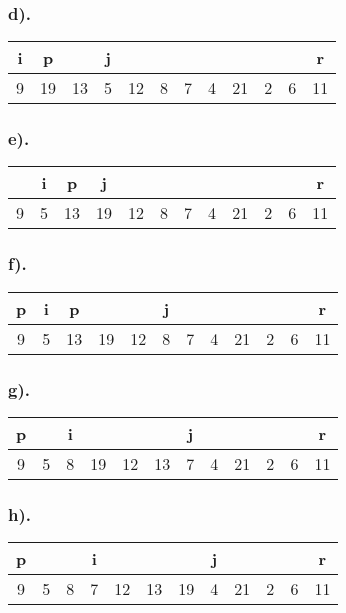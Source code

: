 \documentclass[11pt,letterpaper]{article}
\begin{document}
\subsubsection*{d).}
\begin{tabular}{ | c | c | c | c | c | c | c | c | c | c | c | c | }
		i	&	p	&		&	j	&		&		&		&		&		&		&		&	r	\\
	\hline
		9	&	19	&	13	&	5	&	12	&	8	&	7	&	4	&	21	&	2	&	6	&	11	\\
	\hline
\end{tabular}

\subsubsection*{e).}
\begin{tabular}{ | c | c | c | c | c | c | c | c | c | c | c | c | }
			&	i	&	p	&	j	&		&		&		&		&		&		&		&	r	\\
	\hline
		9	&	5	&	13	&	19	&	12	&	8	&	7	&	4	&	21	&	2	&	6	&	11	\\
	\hline
\end{tabular}

\subsubsection*{f).}
\begin{tabular}{ | c | c | c | c | c | c | c | c | c | c | c | c | }
		p	&	i	&	p	&		&		&	j	&		&		&		&		&		&	r	\\
	\hline
		9	&	5	&	13	&	19	&	12	&	8	&	7	&	4	&	21	&	2	&	6	&	11	\\
	\hline
\end{tabular}

\subsubsection*{g).}
\begin{tabular}{ | c | c | c | c | c | c | c | c | c | c | c | c | }
		p	&		&	i	&		&		&		&	j	&		&		&		&		&	r	\\
	\hline
		9	&	5	&	8	&	19	&	12	&	13	&	7	&	4	&	21	&	2	&	6	&	11	\\
	\hline
\end{tabular}

\subsubsection*{h).}
\begin{tabular}{ | c | c | c | c | c | c | c | c | c | c | c | c | }
		p	&		&		&	i	&		&		&		&	j	&		&		&		&	r	\\
	\hline
		9	&	5	&	8	&	7	&	12	&	13	&	19	&	4	&	21	&	2	&	6	&	11	\\
	\hline
\end{tabular}
\end{document}
